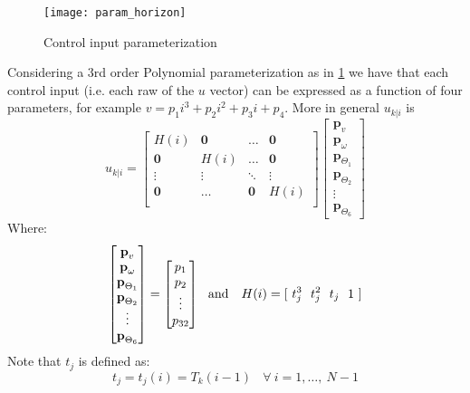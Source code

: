 \begin{figure}[h!]
	\centering
	\texttt{[image: param\_horizon]}
	\caption{Control input parameterization}
	\label{param_horizon}
\end{figure}
Considering a 3rd order Polynomial parameterization as in \ref{param_horizon} we have that each control input (i.e. each raw of the ${u}$ vector) can be expressed as a function of four parameters, for example $v=p_1i^3+p_2i^2+p_3i+p_4$.
More in general ${u}_{k|i}$ is
\begin{equation}
{u}_{k|i}=\left[ \begin{matrix}
H(i)          & \textbf{0} & \dots      & \textbf{0}  \\
\textbf{0} &     H(i)      & \dots      & \textbf{0}  \\
\vdots     & \vdots     & \ddots     & \vdots      \\
\textbf{0} & \dots      & \textbf{0} &   H(i)         \\
\end{matrix} \right] \left[ \begin{matrix} \textbf{p}_v \\ \textbf{p}_{\omega} \\ \textbf{p}_{\Theta_1} \\ \textbf{p}_{\Theta_2} \\ \vdots \\ \textbf{p}_{\Theta_6} \end{matrix} \right]
\end{equation}
Where: 
\begin{equation}
\left[ \begin{matrix} \textbf{p}_v \\ \textbf{p}_{\omega} \\ \textbf{p}_{\Theta_1} \\ \textbf{p}_{\Theta_2} \\ \vdots \\ \textbf{p}_{\Theta_6} \end{matrix} \right] = \left[ \begin{matrix} p_1 \\ p_2 \\ \vdots \\ p_{32} \end{matrix} \right]\ \ \textnormal{and }\ \ H(i)=[\ t_j^3\ \ t_j^2\ \ t_j\ \ 1\ ]
\end{equation}
Note that $t_j$  is defined as:
\begin{equation*}
	t_j=t_j(i)=T_k(i-1)\ \ \ \ \forall\ i=1,\dots,\ N-1
\end{equation*}
